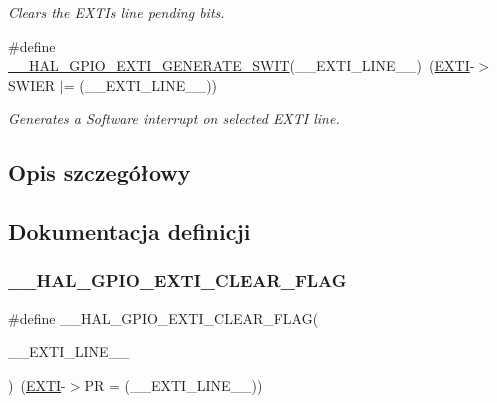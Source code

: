 \begin{DoxyCompactItemize}
\begin{DoxyCompactList}\small\item\em Clears the E\+X\+TI\textquotesingle{}s line pending bits. \end{DoxyCompactList}\item 
\#define \hyperlink{group___g_p_i_o___exported___macros_gac50aef6881e1f76032941ead9c9bce61}{\+\_\+\+\_\+\+H\+A\+L\+\_\+\+G\+P\+I\+O\+\_\+\+E\+X\+T\+I\+\_\+\+G\+E\+N\+E\+R\+A\+T\+E\+\_\+\+S\+W\+IT}(\+\_\+\+\_\+\+E\+X\+T\+I\+\_\+\+L\+I\+N\+E\+\_\+\+\_\+)~(\hyperlink{group___peripheral__declaration_ga9189e770cd9b63dadd36683eb9843cac}{E\+X\+TI}-\/$>$S\+W\+I\+ER $\vert$= (\+\_\+\+\_\+\+E\+X\+T\+I\+\_\+\+L\+I\+N\+E\+\_\+\+\_\+))
\begin{DoxyCompactList}\small\item\em Generates a Software interrupt on selected E\+X\+TI line. \end{DoxyCompactList}\end{DoxyCompactItemize}


\subsection{Opis szczegółowy}


\subsection{Dokumentacja definicji}
\mbox{\label{group___g_p_i_o___exported___macros_ga2f28fc349d1812cdc55a77c68d2b278d}} 
\subsubsection{\texorpdfstring{\+\_\+\+\_\+\+H\+A\+L\+\_\+\+G\+P\+I\+O\+\_\+\+E\+X\+T\+I\+\_\+\+C\+L\+E\+A\+R\+\_\+\+F\+L\+AG}{\_\_HAL\_GPIO\_EXTI\_CLEAR\_FLAG}}
{\footnotesize\ttfamily \#define \+\_\+\+\_\+\+H\+A\+L\+\_\+\+G\+P\+I\+O\+\_\+\+E\+X\+T\+I\+\_\+\+C\+L\+E\+A\+R\+\_\+\+F\+L\+AG(\begin{DoxyParamCaption}\item[{}]{\+\_\+\+\_\+\+E\+X\+T\+I\+\_\+\+L\+I\+N\+E\+\_\+\+\_\+ }\end{DoxyParamCaption})~(\hyperlink{group___peripheral__declaration_ga9189e770cd9b63dadd36683eb9843cac}{E\+X\+TI}-\/$>$PR = (\+\_\+\+\_\+\+E\+X\+T\+I\+\_\+\+L\+I\+N\+E\+\_\+\+\_\+))}



